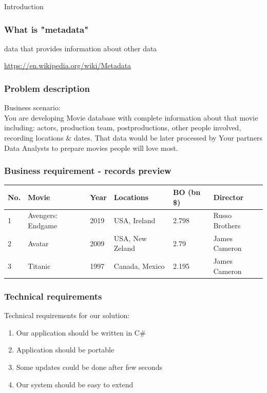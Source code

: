 \documentclass{beamer}
\begin{document}
\begin{section}{Introduction}

\begin{frame}

\frametitle{What is "metadata"}
\begin{displayquote}
data that provides information about other data
\end{displayquote}

\url{https://en.wikipedia.org/wiki/Metadata}

\end{frame}

\begin{frame}
\frametitle{Problem description}
Business scenario:
\\
You are developing Movie database with complete information about that movie including: \pause actors, production team, postproductions, other people involved, recording locations \& dates. \pause
That data would be later processed by Your partners Data Analysts to prepare movies people will love most.
\end{frame}

\begin{frame}
\frametitle{Business requirement - records preview}
\begin{tabular}{| m{0.5cm} | m{3.25cm} | m{1cm} | m{2.25cm} | m{1cm} | m{1.5cm} |}
\hline
No. &  Movie & Year & Locations & BO (bn \$) & Director \\
\hline \hline
1 & Avengers: Endgame & 2019 & USA,  Ireland & 2.798 & Russo Brothers \\ \hline
2 & Avatar & 2009 & USA,  New Zeland & 2.79 & James Cameron \\  \hline
3 & Titanic & 1997 & Canada, Mexico & 2.195 & James Cameron \\  
\hline
\end{tabular}

\end{frame}

\begin{frame}
\frametitle{Technical requirements}
Technical requirements for our solution: \pause
\begin{enumerate}
	\item Our application should be written in C\# \pause
	\item Application should be portable \pause
	\item Some updates could be done after few seconds \pause
	\item Our system should be easy to extend
\end{enumerate}
\end{frame}


\end{section}
\end{document}
